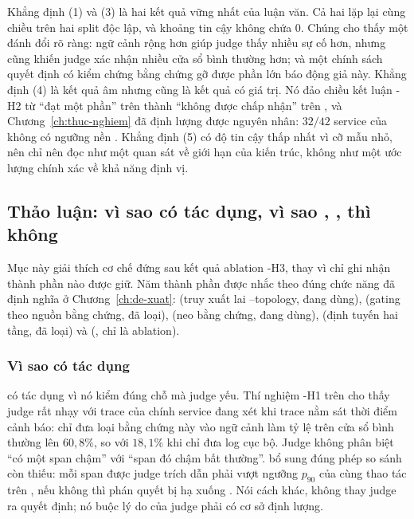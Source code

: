 Khẳng định (1) và (3) là hai kết quả vững nhất của luận văn. Cả hai lặp lại cùng chiều trên hai split độc lập, và khoảng tin cậy không chứa $0$. Chúng cho thấy một đánh đổi rõ ràng: ngữ cảnh rộng hơn giúp judge thấy nhiều sự cố hơn, nhưng cũng khiến judge xác nhận nhiều cửa sổ bình thường hơn; và một chính sách quyết định có kiểm chứng bằng chứng gỡ được phần lớn báo động giả này. Khẳng định (4) là kết quả âm nhưng cũng là kết quả có giá trị. Nó đảo chiều kết luận \hyp{H2} từ ``đạt một phần'' trên  thành ``không được chấp nhận'' trên , và Chương~\ref{ch:thuc-nghiem} đã định lượng được nguyên nhân: $32/42$ service của  không có ngưỡng nền . %
Khẳng định (5) có độ tin cậy thấp nhất vì cỡ mẫu nhỏ, nên chỉ nên đọc như một quan sát về giới hạn của kiến trúc, không như một ước lượng chính xác về khả năng định vị.

\subsection{Thảo luận: vì sao  có tác dụng, vì sao , ,  thì không}
\label{sec:ch7-thao-luan}

Mục này giải thích cơ chế đứng sau kết quả ablation \hyp{H3}, thay vì chỉ ghi nhận thành phần nào được giữ. Năm thành phần được nhắc theo đúng chức năng đã định nghĩa ở Chương~\ref{ch:de-xuat}:  (truy xuất lai --topology, đang dùng),  (gating theo nguồn bằng chứng, đã loại),  (neo bằng chứng, đang dùng),  (định tuyến hai tầng, đã loại) và  (, chỉ là ablation).

\subsubsection{Vì sao  có tác dụng}
\label{sec:ch7-c3}

 có tác dụng vì nó kiểm đúng chỗ mà judge yếu. Thí nghiệm \hyp{H1} trên  cho thấy judge rất nhạy với trace của chính service đang xét khi trace nằm sát thời điểm cảnh báo: chỉ đưa loại bằng chứng này vào ngữ cảnh làm tỷ lệ  trên cửa sổ bình thường lên $60{,}8\%$, so với $18{,}1\%$ khi chỉ đưa log cục bộ. %
Judge không phân biệt ``có một span chậm'' với ``span đó chậm bất thường''.  bổ sung đúng phép so sánh còn thiếu: mỗi span được judge trích dẫn phải vượt ngưỡng $p_{90}$ của cùng thao tác trên , nếu không thì phán quyết bị hạ xuống . Nói cách khác,  không thay judge ra quyết định; nó buộc lý do của judge phải có cơ sở định lượng.

